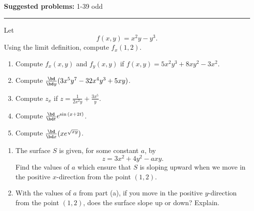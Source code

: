 \documentclass[12pt,reqno]{amsart}
\begin{document}
\textbf{Suggested problems:} 1-39 odd

\bigskip
\hrule

\bigskip

\prob Let
	\[f(x,y) = x^2y-y^3.
	\]
Using the limit definition, compute $f_x(1,2)$.

\vfill
\prob 

\begin{enumerate}
\item Compute $f_x(x,y)$ and $f_y(x,y)$ if $f(x,y) = 5x^2y^3 + 8xy^2 -3x^2$.\vfill
\item Compute $\frac{\bd}{\bd y} ( 3x^5y^7 - 32x^4y^3 + 5xy)$.\vfill
\item Compute $z_x$ if $z = \frac{1}{2x^2y} + \frac{3x^5 }{y}$.\vfill
\item Compute $\frac{\bd}{\bd t} e^{\sin{(x+2t)}}$.\vfill
\item Compute $\frac{\bd}{\bd x}( x e^{\sqrt{xy}})$.\vfill
\end{enumerate}

\newpage
\prob

\begin{enumerate}
\item The surface $S$ is given, for some constant $a$, by
	\[z = 3x^2 + 4y^2 - axy.
	\]
Find the values of $a$ which ensure that $S$ is sloping upward when we move in the positive $x$-direction from the point $(1, 2)$.\vfill
\item With the values of $a$ from part (a), if you move in the positive $y$-direction from the point $(1, 2)$, does the surface slope up or down? Explain.\vfill
\end{enumerate}
\end{document}
